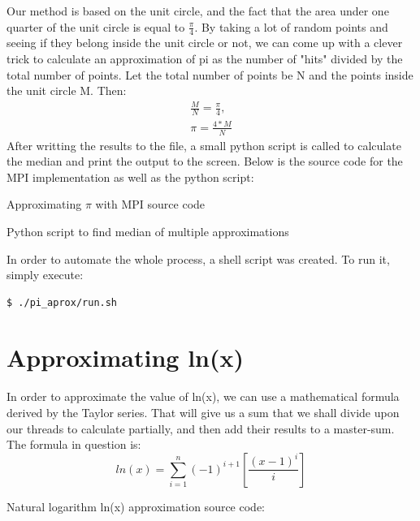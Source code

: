\documentclass{article}
\begin{document}
Our method is based on the unit circle, and the fact that the area under one quarter of the unit circle is equal to $ \frac{\pi}{4} $. By taking a lot of random points and seeing if they belong inside the unit circle or not, we can come up with a clever trick to calculate an approximation of pi as the number of "hits" divided by the total number of points.
Let the total number of points be N and the points inside the unit circle M. Then:
\begin{align}
	\frac{M}{N} = \frac{\pi}{4},\\
	\pi = \frac{4 * M}{N}
\end{align}
After writting the results to the file, a small python script is called to calculate the median and print the output to the screen. Below is the source code for the MPI implementation as well as the python script:
\newpage
\begin{center}
	Approximating $ \pi $ with MPI source code
\end{center}

\newpage
\begin{center}
	Python script to find median of multiple approximations
\end{center}


In order to automate the whole process, a shell script was created. To run it, simply execute:
\begin{lstlisting}[language=bash]
	$ ./pi_aprox/run.sh
\end{lstlisting}



\section{Approximating ln(x)}

In order to approximate the value of ln(x), we can use a mathematical formula derived by the Taylor series.
That will give us a sum that we shall divide upon our threads to calculate partially, and then add their results to a master-sum.
The formula in question is:
\begin{equation}
	ln(x) = \sum_{i=1}^{n}(-1)^{i+1}[\frac{(x-1)^i}{i}]
\end{equation}
\newline
\begin{center}
	Natural logarithm ln(x) approximation source code:
\end{center}
\end{document}
